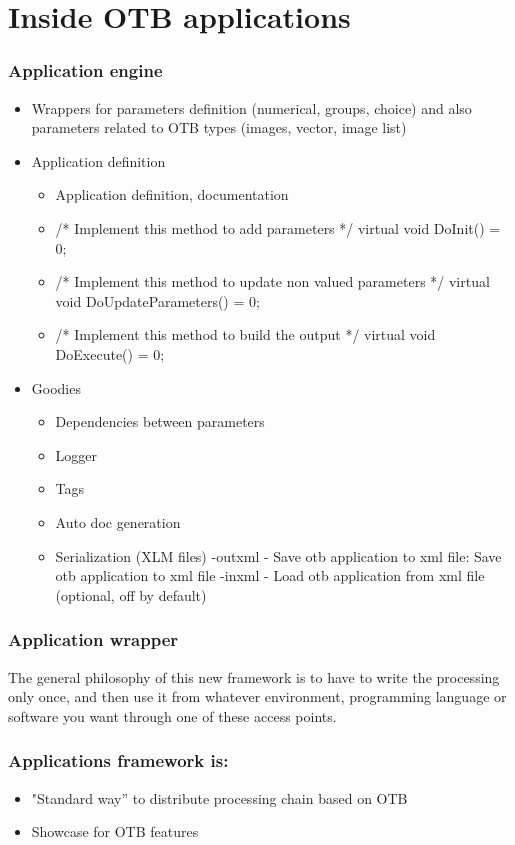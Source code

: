 \documentclass[8pt]{beamer}
\begin{document}
\section{Inside OTB applications}

\begin{frame}
  \frametitle{Application engine}
  \begin{itemize}
  \item Wrappers for parameters definition (numerical, groups, choice) and also
    parameters related to OTB types (images, vector, image list)
  \item Application definition  
    \begin{itemize}
    \item Application definition, documentation
    \item   /* Implement this method to add parameters */ virtual void DoInit() = 0;
    \item /* Implement this method to update non valued parameters */ virtual void DoUpdateParameters() = 0;
    \item /* Implement this method to build the output */ virtual void DoExecute() = 0;
    \end{itemize}
  \item Goodies
    \begin{itemize}
    \item Dependencies between parameters
    \item Logger
    \item Tags
    \item Auto doc generation
    \item Serialization (XLM files) 
      -outxml - Save otb application to xml file: Save otb application to xml file
      -inxml  - Load otb application from xml file  (optional, off by default)
    \end{itemize}
  \end{itemize}
\end{frame}

\begin{frame}
\frametitle{Application wrapper}
The general philosophy of this new framework is to have to write the processing only once, and then use it from whatever environment, programming language or software you want through one of these access points.
\end{frame}

\begin{frame}
\frametitle{Applications framework is:}
\begin{itemize}
  \item "Standard way'' to distribute processing chain based on OTB
  \item Showcase for OTB features
\end{itemize}
\end{frame}
\end{document}
